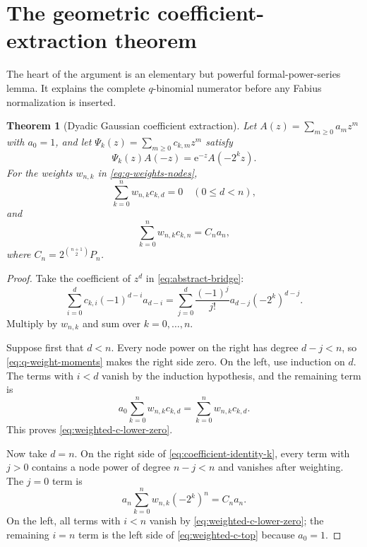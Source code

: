 \documentclass[11pt]{article}
\newtheorem{theorem}{Theorem}[section]
\theoremstyle{definition}
\newcommand{\e}{\mathrm{e}}
\begin{document}
\section{The geometric coefficient-extraction theorem}
\label{sec:coefficient-extraction}

The heart of the argument is an elementary but powerful formal-power-series lemma.  It explains the complete $q$-binomial numerator before any Fabius normalization is inserted.

\begin{theorem}[Dyadic Gaussian coefficient extraction]
Let $A(z)=\sum_{m\ge0}a_mz^m$ with $a_0=1$, and let $\Psi_k(z)=\sum_{m\ge0}c_{k,m}z^m$ satisfy
\begin{equation}
  \Psi_k(z)A(-z)=\e^{-z}A(-2^kz).
  \label{eq:abstract-bridge}
\end{equation}
For the weights $w_{n,k}$ in \cref{eq:q-weights-nodes},
\begin{equation}
  \sum_{k=0}^{n}w_{n,k}c_{k,d}=0
  \quad(0\le d<n),
  \label{eq:weighted-c-lower-zero}
\end{equation}
and
\begin{equation}
  \sum_{k=0}^{n}w_{n,k}c_{k,n}=C_na_n,
  \label{eq:weighted-c-top}
\end{equation}
where $C_n=2^{\binom{n+1}{2}}P_n$.
\end{theorem}

\begin{proof}
Take the coefficient of $z^d$ in \cref{eq:abstract-bridge}:
\begin{equation}
  \sum_{i=0}^{d}c_{k,i}(-1)^{d-i}a_{d-i}
  =\sum_{j=0}^{d}\frac{(-1)^j}{j!}a_{d-j}(-2^k)^{d-j}.
  \label{eq:coefficient-identity-k}
\end{equation}
Multiply by $w_{n,k}$ and sum over $k=0,\ldots,n$.

Suppose first that $d<n$.  Every node power on the right has degree $d-j<n$, so \cref{eq:q-weight-moments} makes the right side zero.  On the left, use induction on $d$.  The terms with $i<d$ vanish by the induction hypothesis, and the remaining term is
\[
  a_0\sum_{k=0}^{n}w_{n,k}c_{k,d}
  =\sum_{k=0}^{n}w_{n,k}c_{k,d}.
\]
This proves \cref{eq:weighted-c-lower-zero}.

Now take $d=n$.  On the right side of \cref{eq:coefficient-identity-k}, every term with $j>0$ contains a node power of degree $n-j<n$ and vanishes after weighting.  The $j=0$ term is
\[
  a_n\sum_{k=0}^{n}w_{n,k}(-2^k)^n=C_na_n.
\]
On the left, all terms with $i<n$ vanish by \cref{eq:weighted-c-lower-zero}; the remaining $i=n$ term is the left side of \cref{eq:weighted-c-top} because $a_0=1$.
\end{proof}
\end{document}
